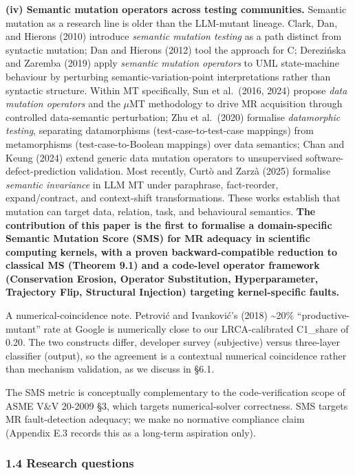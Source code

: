 \documentclass[review,12pt,authoryear]{elsarticle}
\begin{document}
\textbf{(iv) Semantic mutation operators across testing communities.}
Semantic mutation as a research line is older than the LLM-mutant
lineage. Clark, Dan, and Hierons (2010) introduce \emph{semantic
mutation testing} as a path distinct from syntactic mutation; Dan and
Hierons (2012) tool the approach for C; Derezińska and Zaremba (2019)
apply \emph{semantic mutation operators} to UML state-machine behaviour
by perturbing semantic-variation-point interpretations rather than
syntactic structure. Within MT specifically, Sun et al.~(2016, 2024)
propose \emph{data mutation operators} and the $\mu$MT methodology to drive
MR acquisition through controlled data-semantic perturbation; Zhu et
al.~(2020) formalise \emph{datamorphic testing}, separating
datamorphisms (test-case-to-test-case mappings) from metamorphisms
(test-case-to-Boolean mappings) over data semantics; Chan and Keung
(2024) extend generic data mutation operators to unsupervised
software-defect-prediction validation. Most recently, Curtò and Zarzà
(2025) formalise \emph{semantic invariance} in LLM MT under paraphrase,
fact-reorder, expand/contract, and context-shift transformations. These
works establish that mutation can target data, relation, task, and
behavioural semantics. \textbf{The contribution of this paper is the
first to formalise a domain-specific Semantic Mutation Score (SMS) for
MR adequacy in scientific computing kernels, with a proven
backward-compatible reduction to classical MS (Theorem 9.1) and a
code-level operator framework (Conservation Erosion, Operator
Substitution, Hyperparameter, Trajectory Flip, Structural Injection)
targeting kernel-specific faults.}

A numerical-coincidence note. Petrović and Ivanković's (2018)
\textasciitilde20\% ``productive-mutant'' rate at Google is numerically
close to our LRCA-calibrated C1\_share of 0.20. The two constructs
differ, developer survey (subjective) versus three-layer classifier
(output), so the agreement is a contextual numerical coincidence rather
than mechanism validation, as we discuss in §6.1.

The SMS metric is conceptually complementary to the code-verification
scope of ASME V\&V 20-2009 §3, which targets numerical-solver
correctness. SMS targets MR fault-detection adequacy; we make no
normative compliance claim (Appendix E.3 records this as a long-term
aspiration only).

\subsubsection{1.4 Research questions}\label{research-questions}
\end{document}
